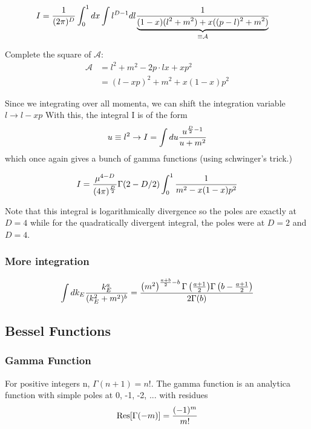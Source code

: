 \documentclass[11pt]{scrartcl}
\begin{document}
\begin{align}
I &= {1 \over (2 \pi)^D} \int_0^1 dx \int l^{D-1} dl {1 \over \underbrace{(1 - x)(l^2 + m^2) + x ((p-l)^2 + m^2)}_{\equiv \mathcal{A}}}
\end{align}

Complete the square of $\mathcal{A}$:
\begin{align}
	\mathcal{A} &= l^2 + m^2 - 2 p \cdot l x + x p^2 \\
	 &= (l- xp)^2 + m^2 + x (1-x) p^2
	 \end{align}

Since we integrating over all momenta, we can shift the integration variable
$l \rightarrow l - xp$
With this, the integral I is of the form $$u \equiv l^2   \rightarrow I = \int du {u^{{D \over 2} - 1}  \over u + m^2}$$
which once again gives a bunch of gamma functions (using schwinger's trick.)

\begin{align}
	I = {\mu^{4 -D} \over (4 \pi)^{D \over 2}} \Gamma(2 - D/2) \int_0^1 {1 \over m^2 - x(1 -x) p^2}
\end{align}

Note that this integral is logarithmically divergence so the poles are exactly at $D = 4$ while for the quadratically divergent integral, the poles were at $D = 2$ and $D=4$.



\subsubsection{More integration}
\begin{align}
	\int dk_E {k_E^a \over (k_E^2 + m^2)^b} = {\left(m^2 \right)^{{a + b \over 2} - b} { \Gamma \left({a + 1 \over 2} \right)} \Gamma \left( {b - {a + 1 \over 2}} \right) \over 2 \Gamma(b)}
\end{align}

\subsection{Bessel Functions}

\subsubsection{Gamma Function}

For positive integers n, $\Gamma(n+1) = n!$.
The gamma function is an analytica function with simple poles at 0, -1, -2, ... with residues 
$$\text{Res}[ \Gamma(-m)] = {(-1)^m \over m!}$$
\end{document}
